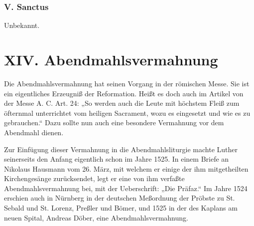
\subsection{V. Sanctus}
Unbekannt.







\chapter{XIV. Abendmahlsvermahnung}

Die Abendmahlsvermahnung hat seinen Vorgang in der römischen Messe. Sie ist ein eigentliches Erzeugniß der Reformation. Heißt es doch auch im Artikel von der Messe A. C. Art. 24: „So werden auch die Leute mit höchstem Fleiß zum öfternmal unterrichtet vom heiligen Sacrament, wozu es eingesetzt und wie es zu gebrauchen.“ Dazu sollte nun auch eine besondere Vermahnung vor dem Abendmahl dienen.

Zur Einfügung dieser Vermahnung in die Abendmahlsliturgie machte Luther seinerseits den Anfang eigentlich schon im Jahre 1525. In einem Briefe an Nikolaus Hausmann vom 26. März, mit welchem er einige der ihm mitgetheilten Kirchengesänge zurücksendet, legt er eine von ihm verfaßte Abendmahlsvermahnung bei, mit der Ueberschrift: „Die Präfaz.“ Im Jahre 1524 erschien auch in Nürnberg in der deutschen Meßordnung der Pröbste zu St. Sebald und St. Lorenz, Preßler und Bömer, und 1525 in der des Kaplans am neuen Spital, Andreas Döber, eine Abendmahlsvermahnung.

